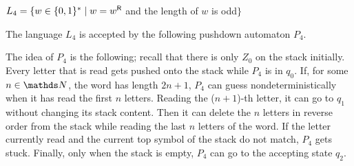 \documentclass{exercise}
\begin{document}
\subtask $L_4 = \{w \in \{0,1\}^* \mid w = w^{\textsf{R}}$ and the length of $w$ is odd$\}$
  \begin{solution}
    The language $L_4$ is accepted by the following pushdown automaton $P_4$.
    \begin{center}
    \end{center}
    The idea of $P_4$ is the following; recall that there is only $Z_0$ on
    the stack initially.  Every letter that is read gets pushed onto the stack
    while $P_4$ is in $q_0$.
    If, for some $n\in\nat$, the word has length $2n+1$, $P_4$ can
    guess nondeterministically when it has read the first $n$ letters.  Reading the
    ($n+1$)-th letter, it can go to $q_1$ without changing its stack content.
    Then it can delete the $n$ letters in reverse order from the stack while
    reading the last $n$ letters of the word.  If the letter currently read and
    the current top symbol of the stack do not match, $P_4$ gets stuck.  Finally,
    only when the stack is empty, $P_4$ can go to the accepting state $q_2$.
  \end{solution}
\end{document}
